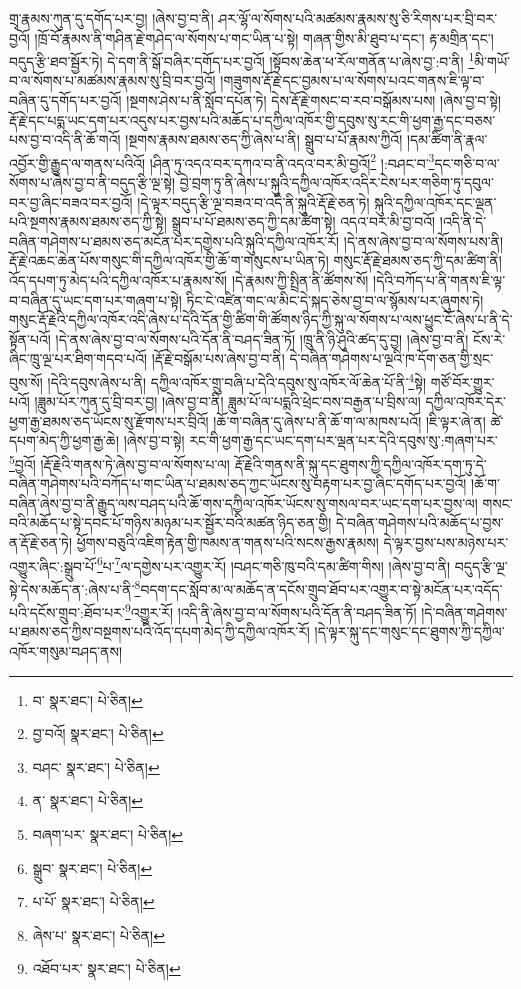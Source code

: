 གྲྭ་རྣམས་ཀུན་དུ་དགོད་པར་བྱ། །ཞེས་བྱ་བ་ནི། ཤར་ལྷོ་ལ་སོགས་པའི་མཚམས་རྣམས་སུ་ཅི་རིགས་པར་བྲི་བར་བྱའོ། །ཁྲོ་བོ་རྣམས་ནི་གཤིན་རྗེ་གཤེད་ལ་སོགས་པ་གང་ཡིན་པ་སྟེ། གཞན་གྱིས་མི་ཐུབ་པ་དང་། རྟ་མགྲིན་དང་། བདུད་རྩི་ཐབ་སྦྱོར་ཏེ། དེ་དག་ནི་སྒོ་བཞིར་དགོད་པར་བྱའོ། །སྟོབས་ཆེན་ཕ་རོལ་གནོན་པ་ཞེས་བྱ་:བ་ནི། \footnote{བ་  སྣར་ཐང་།  པེ་ཅིན། }མི་གཡོ་བ་ལ་སོགས་པ་མཚམས་རྣམས་སུ་བྲི་བར་བྱའོ། །གཟུགས་རྡོ་རྗེ་དང་བྱམས་པ་ལ་སོགས་པའང་གནས་ཇི་ལྟ་བ་བཞིན་དུ་དགོད་པར་བྱའོ། །སྔགས་ཤེས་པ་ནི་སློབ་དཔོན་ཏེ། དེས་རྡོ་རྗེ་གསང་བ་རབ་བསྒོམས་པས། །ཞེས་བྱ་བ་སྟེ། རྡོ་རྗེ་དང་པདྨ་ཡང་དག་པར་འདུས་པར་བྱས་པའི་མཆོད་པ་དཀྱིལ་འཁོར་གྱི་དབུས་སུ་རང་གི་ཕྱག་རྒྱ་དང་བཅས་པས་བྱ་བ་འདི་ནི་ཆོ་གའོ། །སྔགས་རྣམས་ཐམས་ཅད་ཀྱི་ཞེས་པ་ནི། སྒྲུབ་པ་པོ་རྣམས་ཀྱིའོ། །དམ་ཚིག་ནི་རྣལ་འབྱོར་གྱི་རྒྱུད་ལ་གནས་པའིའོ། །ཤིན་ཏུ་འདའ་བར་དཀའ་བ་ནི་འདའ་བར་མི་བྱའོ།\footnote{བྱ་བའོ།  སྣར་ཐང་།  པེ་ཅིན། } །:བཤང་བ་\footnote{བཤང་  སྣར་ཐང་།  པེ་ཅིན། }དང་གཅི་བ་ལ་སོགས་པ་ཞེས་བྱ་བ་ནི་བདུད་རྩི་ལྔ་སྟེ། བྱེ་བྲག་ཏུ་ནི་ཞེས་པ་སྐུའི་དཀྱིལ་འཁོར་འདིར་ངེས་པར་གཅིག་ཏུ་དབུལ་བར་བྱ་ཞིང་བཟའ་བར་བྱའོ། །དེ་ལྟར་བདུད་རྩི་ལྔ་བཟའ་བ་འདི་ནི་སྐུའི་རྡོ་རྗེ་ཅན་ཏེ། སྐུའི་དཀྱིལ་འཁོར་དང་ལྡན་པའི་སྔགས་རྣམས་ཐམས་ཅད་ཀྱི་སྟེ། སྒྲུབ་པ་པོ་ཐམས་ཅད་ཀྱི་དམ་ཚིག་སྟེ། འདའ་བར་མི་བྱ་བའོ། །འདི་ནི་དེ་བཞིན་གཤེགས་པ་ཐམས་ཅད་མངོན་པར་དགྱེས་པའི་སྐུའི་དཀྱིལ་འཁོར་རོ། །དེ་ནས་ཞེས་བྱ་བ་ལ་སོགས་པས་ནི། རྡོ་རྗེ་འཆང་ཆེན་པོས་གསུང་གི་དཀྱིལ་འཁོར་གྱི་ཆོ་ག་གསུངས་པ་ཡིན་ཏེ། གསུང་རྡོ་རྗེ་ཐམས་ཅད་ཀྱི་དམ་ཚིག་ནི། འོད་དཔག་ཏུ་མེད་པའི་དཀྱིལ་འཁོར་པ་རྣམས་སོ། །དེ་རྣམས་ཀྱི་སྤྲིན་ནི་ཚོགས་སོ། །དེའི་བཀོད་པ་ནི་གནས་ཇི་ལྟ་བ་བཞིན་དུ་ཡང་དག་པར་གཞག་པ་སྟེ། ཏིང་ངེ་འཛིན་གང་ལ་མིང་དེ་སྐད་ཅེས་བྱ་བ་ལ་སྙོམས་པར་ཞུགས་ཏེ། གསུང་རྡོ་རྗེའི་དཀྱིལ་འཁོར་འདི་ཞེས་པ་དེའི་དོན་གྱི་ཚིག་གི་ཚོགས་ཉིད་ཀྱི་སྐུ་ལ་སོགས་པ་ལས་ཕྱུང་ངོ་ཞེས་པ་ནི་དེ་སྟོན་པའོ། །དེ་ནས་ཞེས་བྱ་བ་ལ་སོགས་པའི་དོན་ནི་བཤད་ཟིན་ཏོ། །ཁྲུ་ནི་ཉི་ཤུའི་ཚད་དུ་བྱ། །ཞེས་བྱ་བ་ནི། ངོས་རེ་ཞིང་ཁྲུ་ལྔ་པར་ཐིག་གདབ་པའོ། །རྡོ་རྗེ་བསྒོམ་པས་ཞེས་བྱ་བ་ནི། དེ་བཞིན་གཤེགས་པ་ལྔའི་ཁ་དོག་ཅན་གྱི་སྲང་བུས་སོ། །དེའི་དབུས་ཞེས་པ་ནི། དཀྱིལ་འཁོར་གྲུ་བཞི་པ་དེའི་དབུས་སུ་འཁོར་ལོ་ཆེན་པོ་ནི་\footnote{ན་  སྣར་ཐང་།  པེ་ཅིན། }སྟེ། གཙོ་བོར་གྱུར་པའོ། །ཟླུམ་པོར་ཀུན་དུ་བྲི་བར་བྱ། །ཞེས་བྱ་བ་ནི། ཟླུམ་པོ་ལ་པདྨའི་ཕྲེང་བས་བརྒྱན་པ་བྲིས་ལ། དཀྱིལ་འཁོར་དེར་ཕྱག་རྒྱ་ཐམས་ཅད་ཡོངས་སུ་རྫོགས་པར་བྲིའོ། །ཆོ་ག་བཞིན་དུ་ཞེས་པ་ནི་ཆོ་ག་ལ་མཁས་པའོ། །ཇི་ལྟར་ཞེ་ན། ཚེ་དཔག་མེད་ཀྱི་ཕྱག་རྒྱ་ཆེ། །ཞེས་བྱ་བ་སྟེ། རང་གི་ཕྱག་རྒྱ་དང་ཡང་དག་པར་ལྡན་པར་དེའི་དབུས་སུ་:གཞག་པར་\footnote{བཞག་པར་  སྣར་ཐང་།  པེ་ཅིན། }བྱའོ། །རྡོ་རྗེའི་གནས་ཏེ་ཞེས་བྱ་བ་ལ་སོགས་པ་ལ། རྡོ་རྗེའི་གནས་ནི་སྐུ་དང་ཐུགས་ཀྱི་དཀྱིལ་འཁོར་དག་ཏུ་དེ་བཞིན་གཤེགས་པའི་བཀོད་པ་གང་ཡིན་པ་ཐམས་ཅད་ཀྱང་ཡོངས་སུ་བརྟག་པར་བྱ་ཞིང་དགོད་པར་བྱའོ། །ཆོ་ག་བཞིན་ཞེས་བྱ་བ་ནི་རྒྱུད་ལས་བཤད་པའི་ཆོ་གས་དཀྱིལ་འཁོར་ཡོངས་སུ་གསལ་བར་ཡང་དག་པར་བྱས་ལ། གསང་བའི་མཆོད་པ་སྟེ་དབང་པོ་གཉིས་མཉམ་པར་སྦྱོར་བའི་མཚན་ཉིད་ཅན་གྱི། དེ་བཞིན་གཤེགས་པའི་མཆོད་པ་བྱས་ན་རྡོ་རྗེ་ཅན་ཏེ། ཕྱོགས་བཅུའི་འཇིག་རྟེན་གྱི་ཁམས་ན་གནས་པའི་སངས་རྒྱས་རྣམས། དེ་ལྟར་བྱས་པས་མཉེས་པར་འགྱུར་ཞིང་:སྒྲུབ་པོ་\footnote{སྒྲུབ་  སྣར་ཐང་།  པེ་ཅིན། }པ་\footnote{པ་པོ་  སྣར་ཐང་།  པེ་ཅིན། }ལ་དགྱེས་པར་འགྱུར་རོ། །བཤང་གཅི་ཁུ་བའི་དམ་ཚིག་གིས། །ཞེས་བྱ་བ་ནི། བདུད་རྩི་ལྔ་སྟེ་དེས་མཆོད་ན་:ཞེས་པ་ནི་\footnote{ཞེས་པ་  སྣར་ཐང་།  པེ་ཅིན། }བདག་དང་སློབ་མ་ལ་མཆོད་ན་དངོས་གྲུབ་ཐོབ་པར་འགྱུར་བ་སྟེ་མངོན་པར་འདོད་པའི་དངོས་གྲུབ་:ཐོབ་པར་\footnote{འཐོབ་པར་  སྣར་ཐང་།  པེ་ཅིན། }འགྱུར་རོ། །འདི་ནི་ཞེས་བྱ་བ་ལ་སོགས་པའི་དོན་ནི་བཤད་ཟིན་ཏོ། །དེ་བཞིན་གཤེགས་པ་ཐམས་ཅད་ཀྱིས་བསྔགས་པའི་འོད་དཔག་མེད་ཀྱི་དཀྱིལ་འཁོར་རོ། །དེ་ལྟར་སྐུ་དང་གསུང་དང་ཐུགས་ཀྱི་དཀྱིལ་འཁོར་གསུམ་བཤད་ནས། 